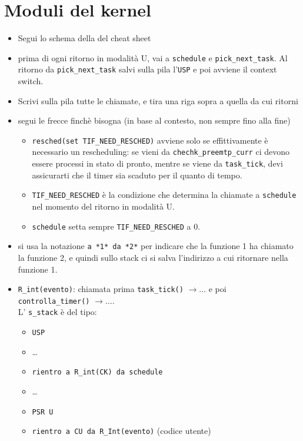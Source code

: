 \documentclass[12pt, a4paper]{report}
\begin{document}
\section*{Moduli del kernel}
\begin{itemize}
	\item Segui lo schema della del cheat sheet
	\item prima di ogni ritorno in modalità U, vai a \texttt{schedule} e
		\texttt{pick\_next\_task}. Al ritorno da \texttt{pick\_next\_task} salvi
		sulla pila l'\texttt{USP} e poi avviene il context switch.
	\item Scrivi sulla pila tutte le chiamate, e tira una riga sopra a quella da
		cui ritorni
	\item segui le frecce finchè bisogna (in base al contesto, non sempre fino
		alla fine)
		\begin{itemize}
			\item \texttt{resched(set TIF\_NEED\_RESCHED)} avviene solo se
				effittivamente è necessario un rescheduling: se vieni da
				\texttt{chechk\_preemtp\_curr} ci devono essere processi in
				stato di pronto, mentre se viene da \texttt{task\_tick}, devi
				assicurarti che il timer sia scaduto per il quanto di tempo.
			\item \texttt{TIF\_NEED\_RESCHED} è la condizione che determina la
				chiamate a \texttt{schedule} nel momento del ritorno in
				modalità U.
			\item \texttt{schedule} setta sempre \texttt{TIF\_NEED\_RESCHED} a
				0.
		\end{itemize}
	\item si usa la notazione \texttt{a *1* da *2*} per indicare che la funzione
		1 ha chiamato la funzione 2, e quindi sullo stack ci si salva
		l'indirizzo a cui ritornare nella funzione 1.
	\item \texttt{R\_int(evento)}: chiamata prima \texttt{task\_tick()} $\to
			\dots$ e poi \texttt{controlla\_timer()} $\to \dots$.\\
		L' \texttt{s\_stack} è del tipo:
		\begin{itemize}
			\item \texttt{USP}
			\item \dots
			\item \texttt{rientro a R\_int(CK) da schedule}
			\item \dots
			\item \texttt{PSR U}
			\item \texttt{rientro a CU da R\_Int(evento)} (codice utente)
		\end{itemize}

\end{itemize}
\end{document}
